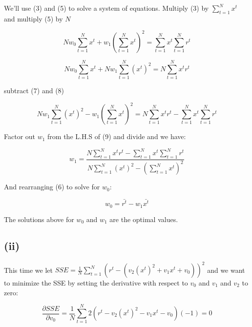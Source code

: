 \documentclass{article}
\begin{document}
We'll use (3) and (5) to solve a system of equations.  Multiply (3) by $\sum\limits_{t = 1}^N x^t$ and multiply (5) by $N$

\begin{equation}
N w_0 \sum\limits_{t = 1}^N x^t + w_1 (\sum\limits_{t = 1}^N x^t)^2 = \sum\limits_{t = 1}^N x^t \sum\limits_{t = 1}^N r^t
\end{equation}

\begin{equation}
N w_0 \sum\limits_{t = 1}^N x^t + N w_1 \sum\limits_{t = 1}^N (x^t)^2 = N \sum\limits_{t = 1}^N x^t r^t
\end{equation}

subtract (7) and (8)

\begin{equation}
N w_1 \sum\limits_{t = 1}^N (x^t)^2 - w_1 (\sum\limits_{t = 1}^N x^t)^2 = N \sum\limits_{t = 1}^N x^t r^t - \sum\limits_{t = 1}^N x^t \sum\limits_{t = 1}^N r^t
\end{equation}

Factor out $w_1$ from the L.H.S of (9) and divide and we have:

\begin{equation}
w_1 = \frac{N \sum\limits_{t = 1}^N x^t r^t - \sum\limits_{t = 1}^N x^t \sum\limits_{t = 1}^N r^t}{N \sum\limits_{t = 1}^N (x^t)^2 - (\sum\limits_{t = 1}^N x^t)^2}
\end{equation}


And rearranging (6) to solve for $w_0$:

\begin{equation}
w_0 = \bar{r^t} - w_1 \bar{x^t}
\end{equation}

The solutions above for $w_0$ and $w_1$ are the optimal values.

\subsection{(ii)}

This time we let $SSE = \frac{1}{N} \sum\limits_{t = 1}^N (r^t - (v_2 (x^t)^2 + v_1x^t + v_0))^2$ and we want to minimize the SSE by setting the derivative with respect to $v_0$ and $v_1$ and $v_2$ to zero:

\begin{equation}
\frac {\partial SSE}{\partial v_0} = \frac{1}{N} \sum\limits_{t = 1}^N 2(r^t - v_2 (x^t)^2 - v_1 x^t - v_0)(-1) = 0
\end{equation}
\end{document}
